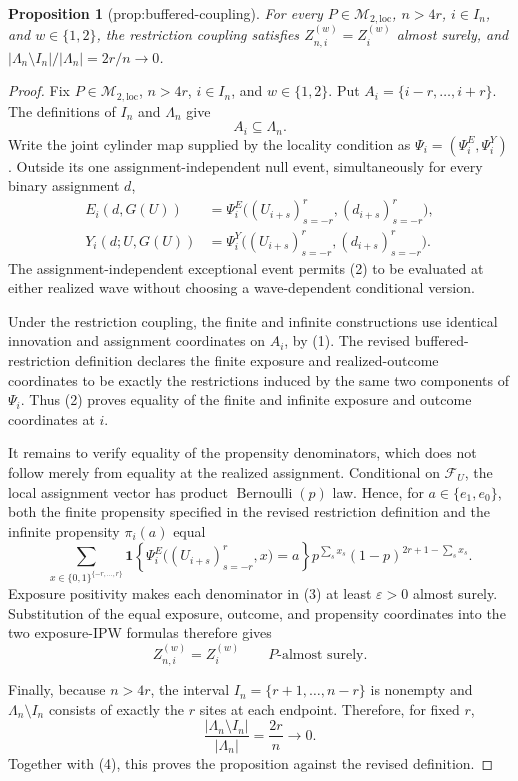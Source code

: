 \documentclass{article}
\newtheorem{proposition}{Proposition}
\begin{document}
\begin{proposition}[prop:buffered-coupling]\label{prop:buffered-coupling}
For every \(P\in\mathcal M_{2,\mathrm{loc}}\), \(n>4r\), \(i\in I_n\), and \(w\in\{1,2\}\), the restriction coupling satisfies \(Z_{n,i}^{(w)}=Z_i^{(w)}\) almost surely, and \(|\Lambda_n\setminus I_n|/|\Lambda_n|=2r/n\to0\).
\end{proposition}
\begin{proof}
Fix \(P\in\mathcal M_{2,\mathrm{loc}}\), \(n>4r\), \(i\in I_n\), and \(w\in\{1,2\}\).  Put \(A_i=\{i-r,\ldots,i+r\}\).  The definitions of \(I_n\) and \(\Lambda_n\) give
\[
 A_i\subseteq\Lambda_n. \tag{1}
\]
Write the joint cylinder map supplied by the locality condition as \(\Psi_i=(\Psi_i^E,\Psi_i^Y)\).  Outside its one assignment-independent null event, simultaneously for every binary assignment \(d\),
\[
 \begin{aligned}
 E_i(d,G(U))
 &=\Psi_i^E\bigl((U_{i+s})_{s=-r}^{r},(d_{i+s})_{s=-r}^{r}\bigr),\\
 Y_i(d;U,G(U))
 &=\Psi_i^Y\bigl((U_{i+s})_{s=-r}^{r},(d_{i+s})_{s=-r}^{r}\bigr).
 \end{aligned} \tag{2}
\]
The assignment-independent exceptional event permits (2) to be evaluated at either realized wave without choosing a wave-dependent conditional version.

Under the restriction coupling, the finite and infinite constructions use identical innovation and assignment coordinates on \(A_i\), by (1).  The revised buffered-restriction definition declares the finite exposure and realized-outcome coordinates to be exactly the restrictions induced by the same two components of \(\Psi_i\).  Thus (2) proves equality of the finite and infinite exposure and outcome coordinates at \(i\).

It remains to verify equality of the propensity denominators, which does not follow merely from equality at the realized assignment.  Conditional on \(\mathcal F_U\), the local assignment vector has product \(\operatorname{Bernoulli}(p)\) law.  Hence, for \(a\in\{e_1,e_0\}\), both the finite propensity specified in the revised restriction definition and the infinite propensity \(\pi_i(a)\) equal
\[
 \sum_{x\in\{0,1\}^{\{-r,\ldots,r\}}}
 \mathbf 1\!\left\{
  \Psi_i^E\bigl((U_{i+s})_{s=-r}^{r},x\bigr)=a
 \right\}
 p^{\sum_sx_s}(1-p)^{2r+1-\sum_sx_s}. \tag{3}
\]
Exposure positivity makes each denominator in (3) at least \(\varepsilon>0\) almost surely.  Substitution of the equal exposure, outcome, and propensity coordinates into the two exposure-IPW formulas therefore gives
\[
 Z_{n,i}^{(w)}=Z_i^{(w)}
 \qquad P\text{-almost surely}. \tag{4}
\]

Finally, because \(n>4r\), the interval \(I_n=\{r+1,\ldots,n-r\}\) is nonempty and \(\Lambda_n\setminus I_n\) consists of exactly the \(r\) sites at each endpoint.  Therefore, for fixed \(r\),
\[
 \frac{|\Lambda_n\setminus I_n|}{|\Lambda_n|}
 =\frac{2r}{n}\longrightarrow0.
\]
Together with (4), this proves the proposition against the revised definition.
\end{proof}
\end{document}
